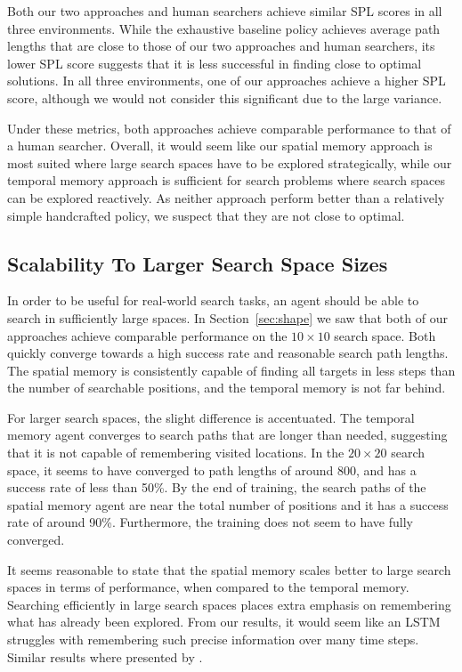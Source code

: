 Both our two approaches and human searchers achieve similar SPL scores in all three environments.
While the exhaustive baseline policy achieves average path lengths that are close to those of our two approaches and human searchers, its lower SPL score suggests that it is less successful in finding close to optimal solutions.
In all three environments, one of our approaches achieve a higher SPL score,
although we would not consider this significant due to the large variance.

Under these metrics, both approaches achieve comparable performance to that of a human searcher. 
Overall, it would seem like our spatial memory approach is most suited where large search spaces have to be explored strategically, while our temporal memory approach is sufficient for search problems where search spaces can be explored reactively.
As neither approach perform better than a relatively simple handcrafted policy, we suspect that they are not close to optimal.

\subsection{Scalability To Larger Search Space Sizes}

In order to be useful for real-world search tasks, an agent should be able to search in sufficiently large spaces.
In Section~\ref{sec:shape} we saw that both of our approaches achieve comparable performance on the \(10 \times 10\) search space.
Both quickly converge towards a high success rate and reasonable search path lengths.
The spatial memory is consistently capable of finding all targets in less steps than the number of searchable positions, and the temporal memory is not far behind.

For larger search spaces, the slight difference is accentuated.
The temporal memory agent converges to search paths that are longer than needed, suggesting that it is not capable of remembering visited locations.
In the \(20 \times 20\) search space, it seems to have converged to path lengths of around 800, and has a success rate of less than 50\%.
By the end of training, the search paths of the spatial memory agent are near the total number of positions and it has a success rate of around 90\%.
Furthermore, the training does not seem to have fully converged.

It seems reasonable to state that the spatial memory scales better to large search spaces in terms of performance, when compared to the temporal memory.
Searching efficiently in large search spaces places extra emphasis on remembering what has already been explored.
From our results, it would seem like an LSTM struggles with remembering such precise information over many time steps.
Similar results where presented by \cite{oh_control_2016}.

